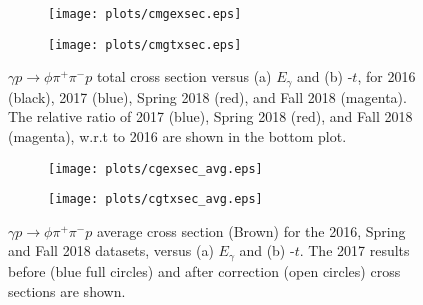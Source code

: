 \begin{center}
\null
\vfill
\begin{figure}[H]
    \centering
    \begin{subfigure}[b]{0.5\textwidth}
        \texttt{[image: plots/cmgexsec.eps]}
        \caption{}
        \label{fig.y2175.xsec_ul.phi2pi.10.a}
    \end{subfigure}\hfill
    \begin{subfigure}[b]{0.5\textwidth}
        \texttt{[image: plots/cmgtxsec.eps]}
        \caption{}
        \label{fig.y2175.xsec_ul.phi2pi.10.b}
    \end{subfigure}
    \caption{\label{fig.y2175.xsec_ul.phi2pi.10}$\gamma p \rightarrow \phi \pi^{+} \pi^{-} p$ total cross section versus (a) $E_{\gamma}$ and (b) -$t$, for 2016 (black), 2017 (blue), Spring 2018 (red), and Fall 2018 (magenta). The relative ratio of 2017 (blue), Spring 2018 (red), and Fall 2018 (magenta), w.r.t to 2016 are shown in the bottom plot.}
\end{figure}
\null
\vfill
\end{center}

\begin{center}
    \null
    \vfill
\begin{figure}[H]
    \centering
    \begin{subfigure}[b]{0.5\textwidth}
        \texttt{[image: plots/cgexsec\_avg.eps]}
        \caption{}
        \label{fig.y2175.xsec_ul.phi2pi.11.a}
    \end{subfigure}\hfill
    \begin{subfigure}[b]{0.5\textwidth}
        \texttt{[image: plots/cgtxsec\_avg.eps]}
        \caption{}
        \label{fig.y2175.xsec_ul.phi2pi.11.b}
    \end{subfigure}
    \caption{\label{fig.y2175.xsec_ul.phi2pi.11}$\gamma p \rightarrow \phi \pi^{+} \pi^{-} p$ average cross section (Brown) for the 2016, Spring and Fall 2018 datasets, versus (a) $E_{\gamma}$ and (b) -$t$. The 2017 results before (blue full circles) and after correction (open circles) cross sections are shown.}
\end{figure}
\end{center}

